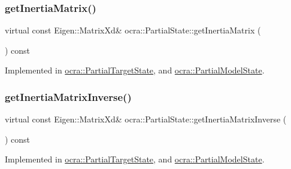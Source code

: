 \subsubsection{\texorpdfstring{get\+Inertia\+Matrix()}{getInertiaMatrix()}}
{\footnotesize\ttfamily virtual const Eigen\+::\+Matrix\+Xd\& ocra\+::\+Partial\+State\+::get\+Inertia\+Matrix (\begin{DoxyParamCaption}{ }\end{DoxyParamCaption}) const\hspace{0.3cm}{\ttfamily [pure virtual]}}



Implemented in \hyperlink{classocra_1_1PartialTargetState_a757cd49fca47e934025e92b81dc15535}{ocra\+::\+Partial\+Target\+State}, and \hyperlink{classocra_1_1PartialModelState_a9fe03ab8c3c4afe56ee4b59f96ac4a25}{ocra\+::\+Partial\+Model\+State}.

\hypertarget{classocra_1_1PartialState_a83979e39dd3631861c724514e49cb8b4}{}\label{classocra_1_1PartialState_a83979e39dd3631861c724514e49cb8b4} 
\subsubsection{\texorpdfstring{get\+Inertia\+Matrix\+Inverse()}{getInertiaMatrixInverse()}}
{\footnotesize\ttfamily virtual const Eigen\+::\+Matrix\+Xd\& ocra\+::\+Partial\+State\+::get\+Inertia\+Matrix\+Inverse (\begin{DoxyParamCaption}{ }\end{DoxyParamCaption}) const\hspace{0.3cm}{\ttfamily [pure virtual]}}



Implemented in \hyperlink{classocra_1_1PartialTargetState_a0e6f90f112e0a54384eb99dd7def49e0}{ocra\+::\+Partial\+Target\+State}, and \hyperlink{classocra_1_1PartialModelState_a664e4f70861eefde844dca6dd09a2213}{ocra\+::\+Partial\+Model\+State}.

\hypertarget{classocra_1_1PartialState_a563b7fb82df68c847120211884019e17}{}\label{classocra_1_1PartialState_a563b7fb82df68c847120211884019e17} 
